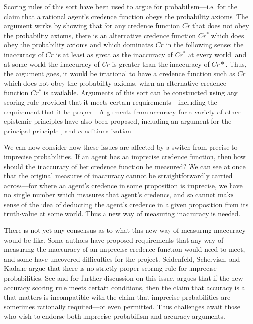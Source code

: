 Scoring rules of this sort have been used to argue for probabilism---i.e. for the claim that a rational agent's credence function obeys the probability axioms. The argument works by showing that for any credence function $Cr$ that does not obey the probability axioms, there is an alternative credence function $Cr^*$ which does obey the probability axioms and which dominates $Cr$ in the following sense: the inaccuracy of $Cr$ is at least as great as the inaccuracy of $Cr^*$ at every world, and at some world the inaccuracy of $Cr$ is greater than the inaccuracy of $Cr*$. Thus, the argument goes, it would be irrational to have a credence function such as $Cr$ which does not obey the probability axioms, when an alternative credence function $Cr^*$ is available. Arguments of this sort can be constructed using any scoring rule provided that it meets certain requirements---including the requirement that it be proper \citep{joyce1998}. Arguments from accuracy for a variety of other epistemic principles have also been proposed, including an argument for the principal principle \citep{pettigrew2013}, and conditionalization \citep{greaveswallace2006}. 

We can now consider how these issues are affected by a switch from precise to imprecise probabilities. If an agent has an imprecise credence function, then how should the inaccuracy of her credence function be measured? We can see at once that the original measures of inaccuracy cannot be straightforwardly carried across---for where an agent's credence in some proposition is imprecise, we have no single number which measures that agent's credence, and so cannot make sense of the idea of deducting the agent's credence in a given proposition from its truth-value at some world. Thus a new way of measuring inaccuracy is needed. 

There is not yet any consensus as to what this new way of measuring inaccuracy would be like. Some authors have proposed requirements that any way of measuring the inaccuracy of an imprecise credence function would need to meet, and some have uncovered difficulties for the project. Seidenfeld, Schervish, and Kadane argue that there is no strictly proper scoring rule for imprecise probabilities. See \citet{seidenfeldschervishkadane2012} and \citet{mayowilsonwheeler2016} for further discussion on this issue. \citet{schoenfield2015} argues that if the new accuracy scoring rule meets certain conditions, then the claim that accuracy is all that matters is incompatible with the claim that imprecise probabilities are sometimes rationally required---or even permitted. Thus challenges await those who wish to endorse both imprecise probabilism and accuracy arguments. 

